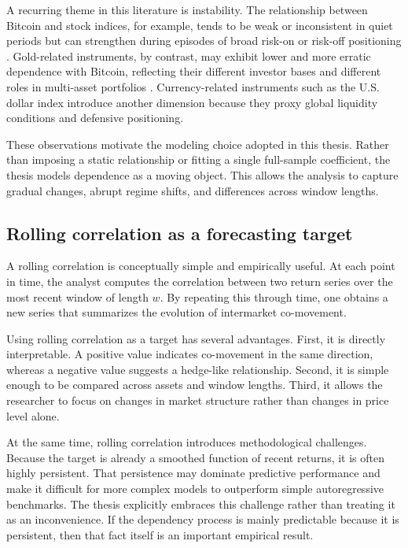 A recurring theme in this literature is instability. The relationship between Bitcoin and stock indices, for example, tends to be weak or inconsistent in quiet periods but can strengthen during episodes of broad risk-on or risk-off positioning \cite{corbet2018}. Gold-related instruments, by contrast, may exhibit lower and more erratic dependence with Bitcoin, reflecting their different investor bases and different roles in multi-asset portfolios \cite{baur2010, bouri2017}. Currency-related instruments such as the U.S. dollar index introduce another dimension because they proxy global liquidity conditions and defensive positioning.

These observations motivate the modeling choice adopted in this thesis. Rather than imposing a static relationship or fitting a single full-sample coefficient, the thesis models dependence as a moving object. This allows the analysis to capture gradual changes, abrupt regime shifts, and differences across window lengths.

\subsection{Rolling correlation as a forecasting target}

A rolling correlation is conceptually simple and empirically useful. At each point in time, the analyst computes the correlation between two return series over the most recent window of length $w$. By repeating this through time, one obtains a new series that summarizes the evolution of intermarket co-movement.

Using rolling correlation as a target has several advantages. First, it is directly interpretable. A positive value indicates co-movement in the same direction, whereas a negative value suggests a hedge-like relationship. Second, it is simple enough to be compared across assets and window lengths. Third, it allows the researcher to focus on changes in market structure rather than changes in price level alone.

At the same time, rolling correlation introduces methodological challenges. Because the target is already a smoothed function of recent returns, it is often highly persistent. That persistence may dominate predictive performance and make it difficult for more complex models to outperform simple autoregressive benchmarks. The thesis explicitly embraces this challenge rather than treating it as an inconvenience. If the dependency process is mainly predictable because it is persistent, then that fact itself is an important empirical result.

